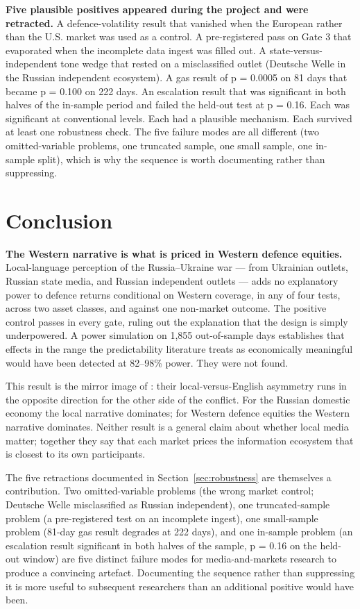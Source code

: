 \documentclass[12pt,a4paper]{article}
\begin{document}
\textbf{Five plausible positives appeared during the project and were retracted.} A defence-volatility result that vanished when the European rather than the U.S. market was used as a control. A pre-registered pass on Gate 3 that evaporated when the incomplete data ingest was filled out. A state-versus-independent tone wedge that rested on a misclassified outlet (Deutsche Welle in the Russian independent ecosystem). A gas result of p = 0.0005 on 81 days that became p = 0.100 on 222 days. An escalation result that was significant in both halves of the in-sample period and failed the held-out test at p = 0.16. Each was significant at conventional levels. Each had a plausible mechanism. Each survived at least one robustness check. The five failure modes are all different (two omitted-variable problems, one truncated sample, one small sample, one in-sample split), which is why the sequence is worth documenting rather than suppressing.

\section{Conclusion}

\textbf{The Western narrative is what is priced in Western defence equities.} Local-language perception of the Russia--Ukraine war --- from Ukrainian outlets, Russian state media, and Russian independent outlets --- adds no explanatory power to defence returns conditional on Western coverage, in any of four tests, across two asset classes, and against one non-market outcome. The positive control passes in every gate, ruling out the explanation that the design is simply underpowered. A power simulation on 1,855 out-of-sample days establishes that effects in the range the predictability literature treats as economically meaningful would have been detected at 82--98\% power. They were not found.

This result is the mirror image of \citet{bondarenko2024}: their local-versus-English asymmetry runs in the opposite direction for the other side of the conflict. For the Russian domestic economy the local narrative dominates; for Western defence equities the Western narrative dominates. Neither result is a general claim about whether local media matter; together they say that each market prices the information ecosystem that is closest to its own participants.

The five retractions documented in Section~\ref{sec:robustness} are themselves a contribution. Two omitted-variable problems (the wrong market control; Deutsche Welle misclassified as Russian independent), one truncated-sample problem (a pre-registered test on an incomplete ingest), one small-sample problem (81-day gas result degrades at 222 days), and one in-sample problem (an escalation result significant in both halves of the sample, p = 0.16 on the held-out window) are five distinct failure modes for media-and-markets research to produce a convincing artefact. Documenting the sequence rather than suppressing it is more useful to subsequent researchers than an additional positive would have been.
\end{document}
